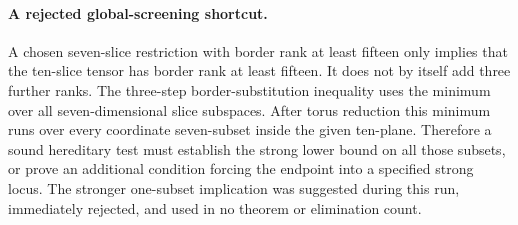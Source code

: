 \paragraph{A rejected global-screening shortcut.}
A chosen seven-slice restriction with border rank at least fifteen
only implies that the ten-slice tensor has border rank at least
fifteen.  It does not by itself add three further ranks.  The
three-step border-substitution inequality uses the minimum over
all seven-dimensional slice subspaces.  After torus reduction this
minimum runs over every coordinate seven-subset inside the given
ten-plane.  Therefore a sound hereditary test must establish the
strong lower bound on all those subsets, or prove an additional
condition forcing the endpoint into a specified strong locus.
The stronger one-subset implication was suggested during this run,
immediately rejected, and used in no theorem or elimination count.
